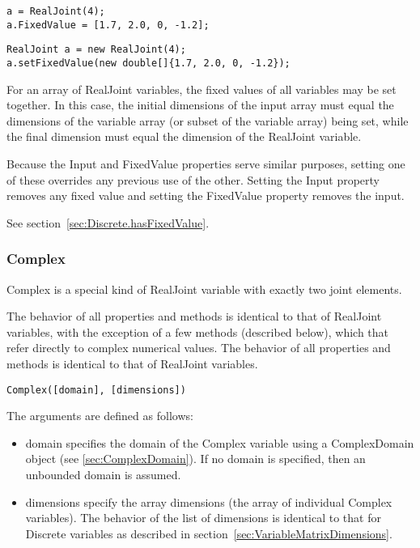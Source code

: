\ifmatlab
\begin{lstlisting}
a = RealJoint(4);
a.FixedValue = [1.7, 2.0, 0, -1.2];
\end{lstlisting}
\fi

\ifjava
\begin{lstlisting}
RealJoint a = new RealJoint(4);
a.setFixedValue(new double[]{1.7, 2.0, 0, -1.2});
\end{lstlisting}
\fi

\ifmatlab
For an array of RealJoint variables, the fixed values of all variables may be set together.  In this case, the initial dimensions of the input array must equal the dimensions of the variable array (or subset of the variable array) being set, while the final dimension must equal the dimension of the RealJoint variable.
\fi

Because the Input and FixedValue properties serve similar purposes, setting one of these overrides any previous use of the other.  Setting the Input property removes any fixed value and setting the FixedValue property removes the input.




See section~\ref{sec:Discrete.hasFixedValue}.



\subsubsection{Complex}

Complex is a special kind of RealJoint variable with exactly two joint elements.

\ifmatlab
The behavior of all properties and methods is identical to that of RealJoint variables, with the exception of a few methods (described below), which that refer directly to complex numerical values. 
\fi
\ifjava
The behavior of all properties and methods is identical to that of RealJoint variables.
\fi


\ifmatlab
\begin{lstlisting}
Complex([domain], [dimensions])
\end{lstlisting}

The arguments are defined as follows:

\begin{itemize}
\item domain specifies the domain of the Complex variable using a ComplexDomain object (see \ref{sec:ComplexDomain}).  If no domain is specified, then an unbounded domain is assumed.
\item dimensions specify the array dimensions (the array of individual Complex variables).  The behavior of the list of dimensions is identical to that for Discrete variables as described in section~\ref{sec:VariableMatrixDimensions}.
\end{itemize}

